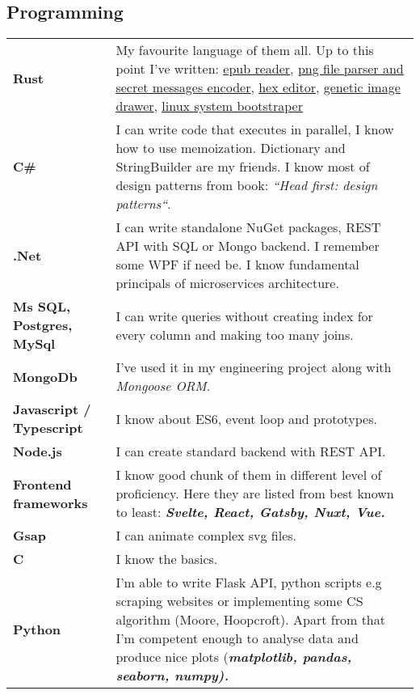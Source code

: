 \documentclass[10pt]{article}
\renewcommand{\arraystretch}{0}
\begin{document}
\subsection{Programming}
\renewcommand{\arraystretch}{2.5}
\begin{table}[H]
    \begin{tabularx}{\textwidth}{@{}l X}
         \textbf{Rust} & My favourite language of them all. Up to this point I've written: \href{https://github.com/Anav0/papcio-rs}{\underline{epub reader}}, \href{https://github.com/Anav0/png-rs}{\underline{png file parser and secret messages encoder}}, \href{https://github.com/Anav0/hex-rs}{\underline{hex editor}}, \href{https://github.com/Anav0/genetic-draw-rs}{\underline{genetic image drawer}}, \href{https://github.com/Anav0/ubuntu-bootstrap-rs}{\underline{linux system bootstraper}}\\
         \textbf{C\#} & I can write code that executes in parallel, I know how to use memoization. Dictionary and StringBuilder are my friends. I know most of design patterns from book: \emph{``Head first: design patterns``}.\\
         \textbf{.Net} & I can write standalone NuGet packages, REST API with SQL or Mongo backend. I remember some WPF if need be. I know fundamental principals of microservices architecture. \\
         \textbf{Ms SQL, Postgres, MySql} & I can write queries without creating index for every column and making too many joins. \\
         \textbf{MongoDb} & I've used it in my engineering project along with \emph{Mongoose ORM}. \\
	 \textbf{Javascript / Typescript} & I know about ES6, event loop and prototypes.\\
	 \textbf{Node.js} & I can create standard backend with REST API.\\
         \textbf{Frontend frameworks} & I know good chunk of them in different level of proficiency. Here they are listed from best known to least: \bfseries \em Svelte, React, Gatsby, Nuxt, Vue. \\
         \textbf{Gsap} & I can animate complex svg files.\\
	 \textbf{C} & I know the basics.\\
         \textbf{Python} & I'm able to write Flask API, python scripts e.g scraping websites or implementing some CS algorithm (Moore, Hoopcroft). Apart from that I'm competent enough to analyse data and produce nice plots (\bfseries \em matplotlib, pandas, seaborn, numpy). \\

    \end{tabularx}
\end{table}
\end{document}
